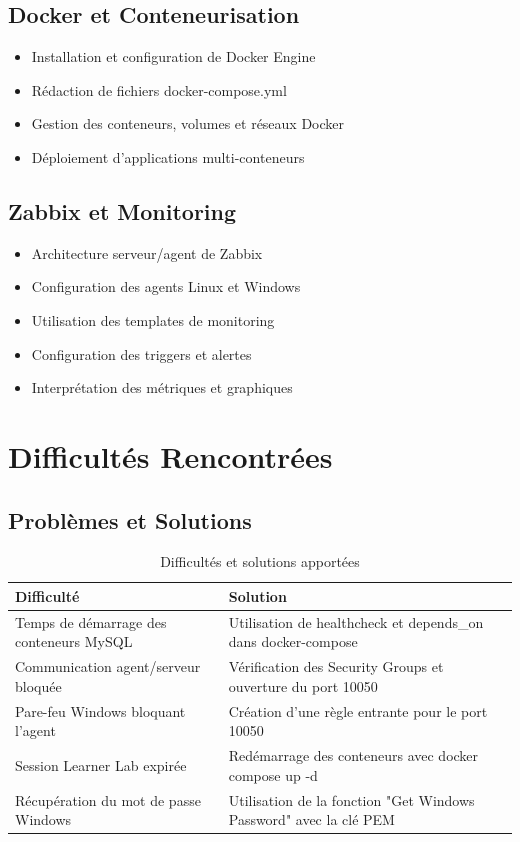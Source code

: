 \subsection{Docker et Conteneurisation}

\begin{itemize}
    \item Installation et configuration de Docker Engine
    \item Rédaction de fichiers docker-compose.yml
    \item Gestion des conteneurs, volumes et réseaux Docker
    \item Déploiement d'applications multi-conteneurs
\end{itemize}

\subsection{Zabbix et Monitoring}

\begin{itemize}
    \item Architecture serveur/agent de Zabbix
    \item Configuration des agents Linux et Windows
    \item Utilisation des templates de monitoring
    \item Configuration des triggers et alertes
    \item Interprétation des métriques et graphiques
\end{itemize}

\section{Difficultés Rencontrées}

\subsection{Problèmes et Solutions}

\begin{table}[H]
\centering
\caption{Difficultés et solutions apportées}
\label{tab:difficulties}
\begin{tabular}{|p{5.5cm}|p{8cm}|}
\hline
\textbf{Difficulté} & \textbf{Solution} \\
\hline
Temps de démarrage des conteneurs MySQL & Utilisation de healthcheck et depends\_on dans docker-compose \\
\hline
Communication agent/serveur bloquée & Vérification des Security Groups et ouverture du port 10050 \\
\hline
Pare-feu Windows bloquant l'agent & Création d'une règle entrante pour le port 10050 \\
\hline
Session Learner Lab expirée & Redémarrage des conteneurs avec docker compose up -d \\
\hline
Récupération du mot de passe Windows & Utilisation de la fonction "Get Windows Password" avec la clé PEM \\
\hline
\end{tabular}
\end{table}


